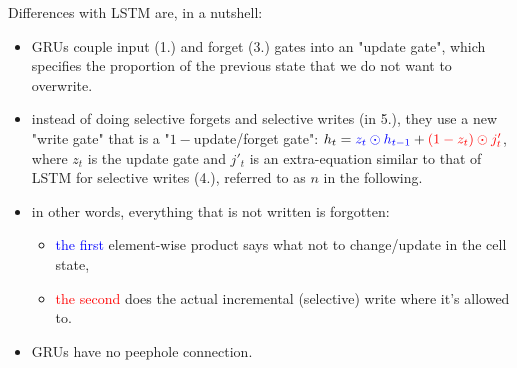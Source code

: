 \documentclass{article}
\begin{document}
Differences with LSTM are, in a nutshell:
\begin{itemize}[nosep]
  \item GRUs couple input (1.) and forget (3.) gates into an "update gate", which specifies the proportion of the previous state that we do not want to overwrite.
  \item instead of doing selective forgets and selective writes (in 5.), they use a new "write gate" that is a "$1-$update/forget gate": $h_t=\textcolor{blue}{z_t \odot h_{t-1}} + \textcolor{red}{(1-z_t) \odot j'_t}$, where $z_t$ is the update gate and $j'_t$ is an extra-equation similar to that of LSTM for selective writes (4.), referred to as $n$ in the following.
  \item in other words, everything that is not written is forgotten:
        \begin{itemize}[nosep]
          \item \textcolor{blue}{the first} element-wise product says what not to change/update in the cell state,
          \item \textcolor{red}{the second} does the actual incremental (selective) write where it's allowed to.
        \end{itemize}
  \item GRUs have no peephole connection.
\end{itemize}
\end{document}
